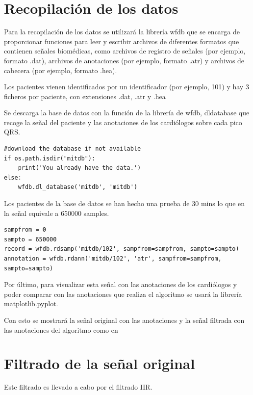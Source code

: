 \section{Recopilación de los datos}
Para la recopilación de los datos se utilizará la librería wfdb que se encarga de proporcionar
funciones para leer y escribir archivos de diferentes formatos que contienen señales biomédicas,
como archivos de registro de señales (por ejemplo, formato .dat), archivos de anotaciones
(por ejemplo, formato .atr) y archivos de cabecera (por ejemplo, formato .hea).

Los pacientes vienen identificados por un identificador (por ejemplo, 101) y hay 3 ficheros por paciente, 
con extensiones .dat, .atr y .hea

Se descarga la base de datos con la función de la librería de wfdb, dldatabase que recoge 
la señal del paciente y las anotaciones de los cardiólogos sobre cada pico QRS.


\lstset{language=python, breaklines=true, basicstyle=\footnotesize}
\begin{lstlisting}[frame=single]
#download the database if not available
if os.path.isdir("mitdb"):
	print('You already have the data.')
else:
	wfdb.dl_database('mitdb', 'mitdb')
\end{lstlisting}

Los pacientes de la base de datos se han hecho una prueba de 30 mins lo que en la señal 
equivale a 650000 samples.

\lstset{language=python, breaklines=true, basicstyle=\footnotesize}
\begin{lstlisting}[frame=single]
sampfrom = 0
sampto = 650000
record = wfdb.rdsamp('mitdb/102', sampfrom=sampfrom, sampto=sampto)
annotation = wfdb.rdann('mitdb/102', 'atr', sampfrom=sampfrom, sampto=sampto)
\end{lstlisting}

Por último, para visualizar esta señal con las anotaciones de los cardiólogos y poder comparar 
con las anotaciones que realiza el algoritmo se usará la librería matplotlib.pyplot.

Con esto se mostrará la señal original con las anotaciones y la señal filtrada con las anotaciones
del algoritmo como en 

\section{Filtrado de la señal original}
Este filtrado es llevado a cabo por el filtrado IIR.

